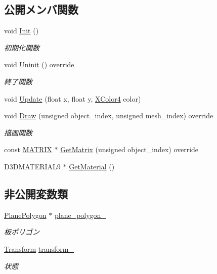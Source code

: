 \subsection*{公開メンバ関数}
\begin{DoxyCompactItemize}
\item 
void \mbox{\hyperlink{class_render_texture_a498eb8be8672e01164b3770cdff43291}{Init}} ()
\begin{DoxyCompactList}\small\item\em 初期化関数 \end{DoxyCompactList}\item 
void \mbox{\hyperlink{class_render_texture_a0e55cd9b412d87dfe1f4b90f29f357c8}{Uninit}} () override
\begin{DoxyCompactList}\small\item\em 終了関数 \end{DoxyCompactList}\item 
void \mbox{\hyperlink{class_render_texture_ac27f8cfac7903dd502de61e22abfc457}{Update}} (float x, float y, \mbox{\hyperlink{_vector3_d_8h_a680c30c4a07d86fe763c7e01169cd6cc}{X\+Color4}} color)
\item 
void \mbox{\hyperlink{class_render_texture_a529ab829c676470ae5764b42cba9efb0}{Draw}} (unsigned object\+\_\+index, unsigned mesh\+\_\+index) override
\begin{DoxyCompactList}\small\item\em 描画関数 \end{DoxyCompactList}\item 
const \mbox{\hyperlink{_vector3_d_8h_a032295cd9fb1b711757c90667278e744}{M\+A\+T\+R\+IX}} $\ast$ \mbox{\hyperlink{class_render_texture_a0e9746f5cebdd088f2303e18cbc52eae}{Get\+Matrix}} (unsigned object\+\_\+index) override
\item 
D3\+D\+M\+A\+T\+E\+R\+I\+A\+L9 $\ast$ \mbox{\hyperlink{class_render_texture_adb19f86d2ac55e95d8725c64a846e8d0}{Get\+Material}} ()
\end{DoxyCompactItemize}
\subsection*{非公開変数類}
\begin{DoxyCompactItemize}
\item 
\mbox{\hyperlink{class_plane_polygon}{Plane\+Polygon}} $\ast$ \mbox{\hyperlink{class_render_texture_ad354ed8b9968b5741feb43775cc821b9}{plane\+\_\+polygon\+\_\+}}
\begin{DoxyCompactList}\small\item\em 板ポリゴン \end{DoxyCompactList}\item 
\mbox{\hyperlink{class_transform}{Transform}} \mbox{\hyperlink{class_render_texture_a390e49a5efe8a6a977e8ba287ec969a2}{transform\+\_\+}}
\begin{DoxyCompactList}\small\item\em 状態 \end{DoxyCompactList}\end{DoxyCompactItemize}


